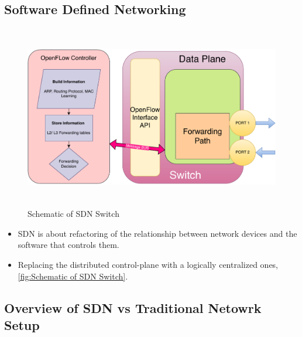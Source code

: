\documentclass[12pt,letterpaper]{article}
\begin{document}
    \subsection{Software Defined Networking}

    \begin{figure}[ht]
        \centering
        \includegraphics[height=8cm]{images/schematicSDNSw.drawio.pdf}
        \caption{Schematic of SDN Switch}
        \label{fig:Schematic of SDN Switch}
    \end{figure}

    \begin{itemize}
        \item SDN is about refactoring of the relationship between network devices and the software that controls them. 

        \item Replacing the distributed control-plane with a logically centralized ones, \autoref{fig:Schematic of SDN Switch}.
    \end{itemize}


    \subsection{Overview of SDN vs Traditional Netowrk Setup}
\end{document}
